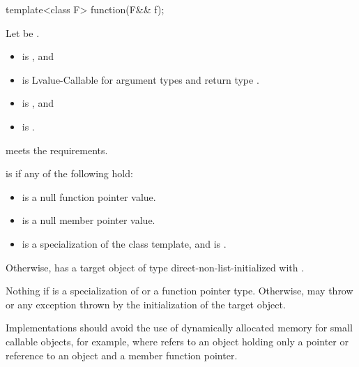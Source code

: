 %
\begin{itemdecl}
template<class F> function(F&& f);
\end{itemdecl}

\begin{itemdescr}
\pnum
Let  be .

\pnum
\constraints
\begin{itemize}
\item
{} is , and
\item
{} is Lvalue-Callable for argument types
 and return type .
\end{itemize}

\pnum
\mandates
\begin{itemize}
\item
{} is , and
\item
{} is .
\end{itemize}

\pnum
\expects
{} meets the  requirements.

\pnum
\ensures
{} is  if any of the following hold:
\begin{itemize}
\item {} is a null function pointer value.
\item {} is a null member pointer value.
\item {} is
a specialization of the  class template, and
 is .
\end{itemize}

\pnum
Otherwise,  has a target object of type 
direct-non-list-initialized with .

\pnum
\throws
Nothing if  is
a specialization of  or
a function pointer type.
Otherwise, may throw  or
any exception thrown by the initialization of the target object.

\pnum
\recommended
Implementations should avoid the use of
dynamically allocated memory for small callable objects, for example,
where  refers to an object holding only a pointer or
reference to an object and a member function pointer.
\end{itemdescr}


